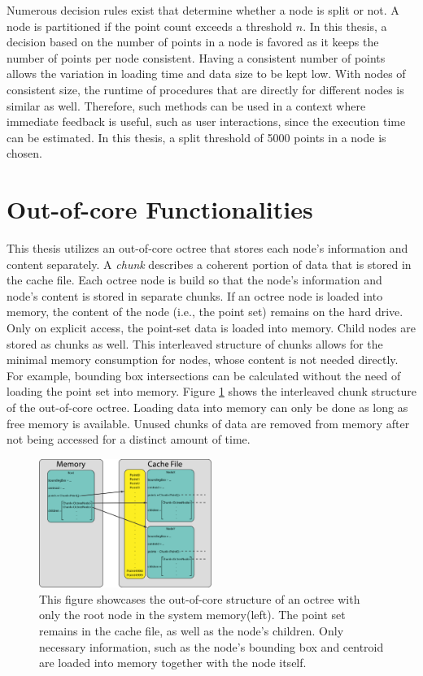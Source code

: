 \par

Numerous decision rules exist that determine whether a node is split or not. A node is partitioned if the point count exceeds a threshold $n$. In this thesis, a decision based on the number of points in a node is favored as it keeps the number of points per node consistent.
Having a consistent number of points allows the variation in loading time and data size to be kept low. With nodes of consistent size, the runtime of procedures that are directly for different nodes is similar as well. Therefore, such methods can be used in a context where immediate feedback is useful, such as user interactions, since the execution time can be estimated. In this thesis, a split threshold of 5000 points in a node is chosen. 


\section{Out-of-core Functionalities}

This thesis utilizes an out-of-core octree that stores each node's information and content separately. A \textit{chunk} describes a coherent portion of data that is stored in the cache file. Each octree node is build so that the node's information and node's content is stored in separate chunks. If an octree node is loaded into memory, the content of the node (i.e., the point set) remains on the hard drive. Only on explicit access, the point-set data is loaded into memory. Child nodes are stored as chunks as well. This interleaved structure of chunks allows for the minimal memory consumption for nodes, whose content is not needed directly. For example, bounding box intersections can be calculated without the need of loading the point set into memory. Figure \ref{fig:out-of-core} shows the interleaved chunk structure of the out-of-core octree. Loading data into memory can only be done as long as free memory is available. Unused chunks of data are removed from memory after not being accessed for a distinct amount of time.

\begin{figure}
    \centering
    \includegraphics[width=0.5\textwidth]{Octree/out-of-core.png}
    \caption[Graphic describing the out-of-core structure of the octree]
        {This figure showcases the out-of-core structure of an octree with only the root node in the system memory(left). The point set remains in the cache file, as well as the node's children. Only necessary information, such as the node's bounding box and centroid are loaded into memory together with the node itself.}
    \label{fig:out-of-core}
\end{figure}


